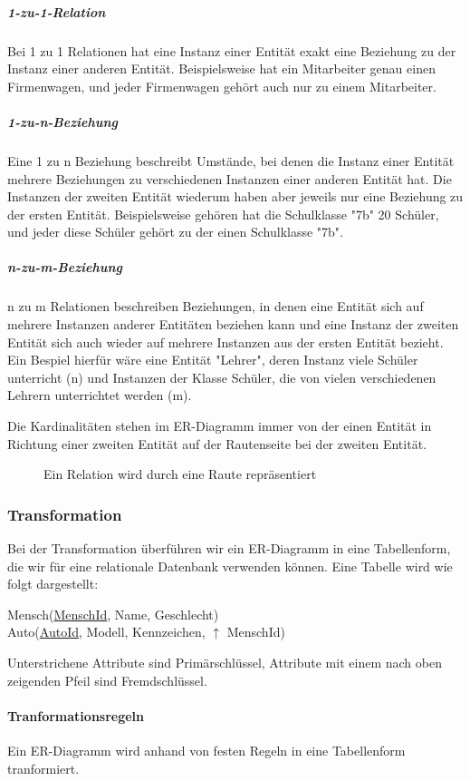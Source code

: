 \documentclass{article}
\begin{document}
	\subparagraph{1-zu-1-Relation}
	Bei 1 zu 1 Relationen hat eine Instanz einer Entität exakt eine Beziehung zu der Instanz einer anderen Entität. Beispielsweise hat ein Mitarbeiter genau einen Firmenwagen, und jeder Firmenwagen gehört auch nur zu einem Mitarbeiter.

	\subparagraph{1-zu-n-Beziehung}
	Eine 1 zu n Beziehung beschreibt Umstände, bei denen die Instanz einer Entität mehrere Beziehungen zu verschiedenen Instanzen einer anderen Entität hat. Die Instanzen der zweiten Entität wiederum haben aber jeweils nur eine Beziehung zu der ersten Entität. Beispielsweise gehören hat die Schulklasse "7b" 20 Schüler, und jeder diese Schüler gehört zu der einen Schulklasse "7b".

	\subparagraph{n-zu-m-Beziehung}
	n zu m Relationen beschreiben Beziehungen, in denen eine Entität sich auf mehrere Instanzen anderer Entitäten beziehen kann und eine Instanz der zweiten Entität sich auch wieder auf mehrere Instanzen aus der ersten Entität bezieht. Ein Bespiel hierfür wäre eine Entität "Lehrer", deren Instanz viele Schüler unterricht (n) und Instanzen der Klasse Schüler, die von vielen verschiedenen Lehrern unterrichtet werden (m).

	Die Kardinalitäten stehen im ER-Diagramm immer von der einen Entität in Richtung einer zweiten Entität auf der Rautenseite bei der zweiten Entität.

	\begin{figure}[h!]
		\centering
		
		\caption{Ein Relation wird durch eine Raute repräsentiert}
	\end{figure}

	\subsubsection{Transformation}
	Bei der Transformation überführen wir ein ER-Diagramm in eine Tabellenform, die wir für eine relationale Datenbank verwenden können.
	Eine Tabelle wird wie folgt dargestellt:
	\begin{center}
		Mensch(\underline{MenschId}, Name, Geschlecht) \\
		Auto(\underline{AutoId}, Modell, Kennzeichen, $\uparrow$ MenschId)
	\end{center}
	Unterstrichene Attribute sind Primärschlüssel, Attribute mit einem nach oben zeigenden Pfeil sind Fremdschlüssel.

	\paragraph{Tranformationsregeln}
	Ein ER-Diagramm wird anhand von festen Regeln in eine Tabellenform tranformiert.
\end{document}
